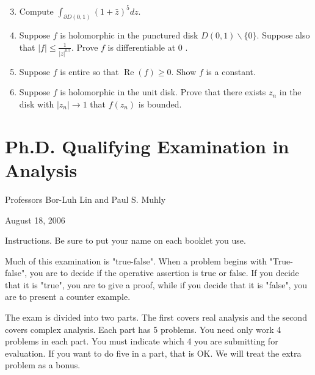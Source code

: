 \documentclass[10pt]{article}
\begin{document}
\begin{enumerate}
  \setcounter{enumi}{2}
  \item Compute $\int_{\partial D(0,1)}(1+\bar{z})^{5} d z$.

  \item Suppose $f$ is holomorphic in the punctured disk $D(0,1) \backslash\{0\}$. Suppose also that $|f| \leq \frac{1}{|z|^{0.5}}$. Prove $f$ is differentiable at 0 .

  \item Suppose $f$ is entire so that $\operatorname{Re}(f) \geq 0$. Show $f$ is a constant.

  \item Suppose $f$ is holomorphic in the unit disk. Prove that there exists $z_{n}$ in the disk with $\left|z_{n}\right| \rightarrow 1$ that $f\left(z_{n}\right)$ is bounded.

\end{enumerate}
\section{Ph.D. Qualifying Examination in Analysis}
Professors Bor-Luh Lin and Paul S. Muhly

August 18, 2006

Instructions. Be sure to put your name on each booklet you use.

Much of this examination is "true-false". When a problem begins with "True-false", you are to decide if the operative assertion is true or false. If you decide that it is "true", you are to give a proof, while if you decide that it is "false", you are to present a counter example.

The exam is divided into two parts. The first covers real analysis and the second covers complex analysis. Each part has 5 problems. You need only work 4 problems in each part. You must indicate which 4 you are submitting for evaluation. If you want to do five in a part, that is OK. We will treat the extra problem as a bonus.
\end{document}
